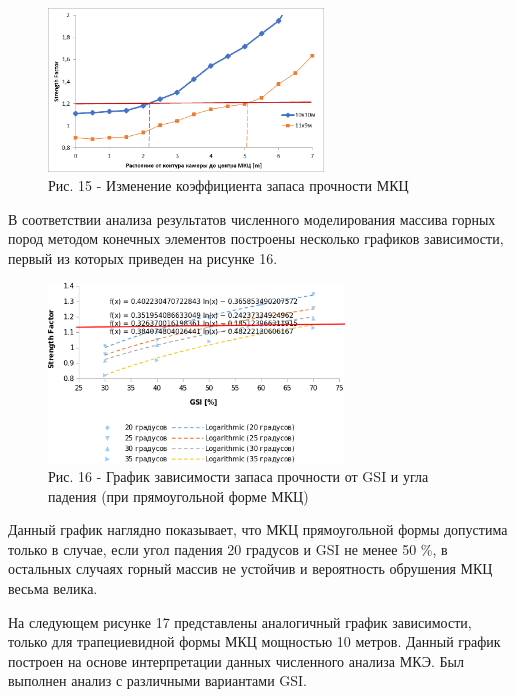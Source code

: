 \begin{figure}[H]
	\centering
	\includegraphics[width=0.65\textwidth]{assets/295}
	\caption*{Рис. 15 - Изменение коэффициента запаса прочности МКЦ}
\end{figure}

В соответствии анализа результатов численного моделирования массива
горных пород методом конечных элементов построены несколько графиков
зависимости, первый из которых приведен на рисунке 16.

\begin{figure}[H]
	\centering
	\includegraphics[width=0.7\textwidth]{assets/295.1}
	\caption*{Рис. 16 - График зависимости запаса прочности от GSI и угла падения (при прямоугольной форме МКЦ)}
\end{figure}

\begin{multicols}{2}
Данный график наглядно показывает, что МКЦ прямоугольной формы допустима
только в случае, если угол падения 20 градусов и GSI не менее 50 \%, в
остальных случаях горный массив не устойчив и вероятность обрушения МКЦ
весьма велика.

На следующем рисунке 17 представлены аналогичный график зависимости,
только для трапециевидной формы МКЦ мощностью 10 метров. Данный график
построен на основе интерпретации данных численного анализа МКЭ. Был
выполнен анализ с различными вариантами GSI.
\end{multicols}

